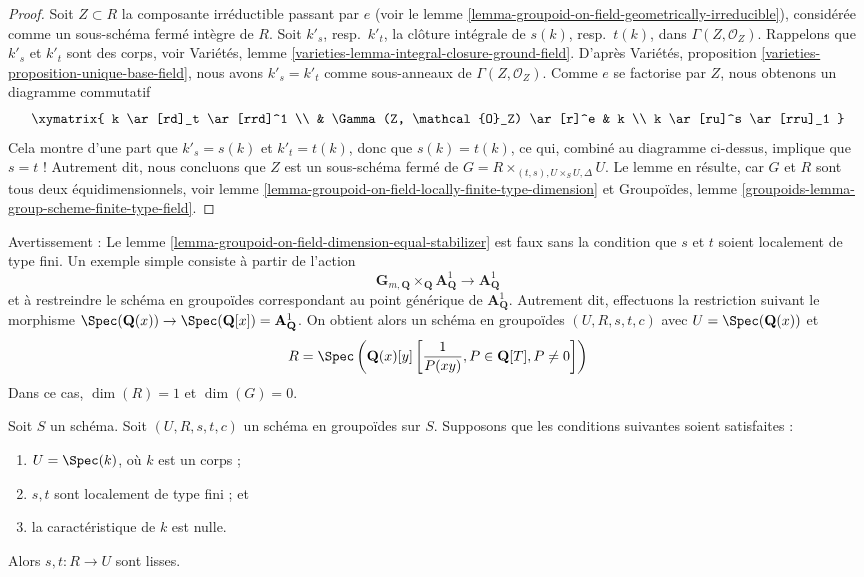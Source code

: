 \begin{proof}
Soit $Z \subset R$ la composante irréductible passant par $e$ (voir le
lemme \ref{lemma-groupoid-on-field-geometrically-irreducible}),
considérée comme un sous-schéma fermé intègre de $R$.
Soit $k'_s$, resp.\ $k'_t$, la clôture intégrale de
$s(k)$, resp.\ $t(k)$, dans $\Gamma(Z, \mathcal{O}_Z)$.
Rappelons que $k'_s$ et $k'_t$ sont des corps, voir
Variétés, lemme \ref{varieties-lemma-integral-closure-ground-field}.
D'après
Variétés, proposition \ref{varieties-proposition-unique-base-field},
nous avons $k'_s = k'_t$ comme sous-anneaux de $\Gamma(Z, \mathcal{O}_Z)$.
Comme $e$ se factorise par $Z$, nous obtenons un diagramme commutatif
$$
\xymatrix{
k \ar[rd]_t \ar[rrd]^1 \\
& \Gamma(Z, \mathcal{O}_Z) \ar[r]^e & k \\
k \ar[ru]^s \ar[rru]_1
}
$$
Cela montre d'une part que $k'_s = s(k)$ et $k'_t = t(k)$, donc que
$s(k) = t(k)$, ce qui, combiné au diagramme ci-dessus, implique
que $s = t$ ! Autrement dit, nous concluons que $Z$ est un sous-schéma fermé
de $G = R \times_{(t, s), U \times_S U, \Delta} U$.
Le lemme en résulte, car $G$ et $R$ sont tous deux équidimensionnels, voir
lemme \ref{lemma-groupoid-on-field-locally-finite-type-dimension} et
Groupoïdes, lemme \ref{groupoids-lemma-group-scheme-finite-type-field}.
\end{proof}

\begin{remark}
\label{remark-warn-dimension-groupoid-on-field}
Avertissement :
Le lemme \ref{lemma-groupoid-on-field-dimension-equal-stabilizer}
est faux sans la condition que $s$ et $t$ soient localement de
type fini.
Un exemple simple consiste à partir de l'action
$$
\mathbf{G}_{m, \mathbf{Q}} \times_{\mathbf{Q}} \mathbf{A}^1_{\mathbf{Q}}
\to \mathbf{A}^1_{\mathbf{Q}}
$$
et à restreindre le schéma en groupoïdes correspondant au point générique de
$\mathbf{A}^1_{\mathbf{Q}}$. Autrement dit, effectuons la restriction suivant le morphisme
$\Spec(\mathbf{Q}(x)) \to
\Spec(\mathbf{Q}[x]) = \mathbf{A}^1_{\mathbf{Q}}$.
On obtient alors un schéma en groupoïdes
$(U, R, s, t, c)$ avec
$U = \Spec(\mathbf{Q}(x))$
et
$$
R = \Spec\left(
\mathbf{Q}(x)[y]\left[
\frac{1}{P(xy)}, P \in \mathbf{Q}[T], P \not = 0
\right]
\right)
$$
Dans ce cas, $\dim(R) = 1$ et $\dim(G) = 0$.
\end{remark}

\begin{lemma}
\label{lemma-groupoid-characteristic-zero-smooth}
Soit $S$ un schéma. Soit $(U, R, s, t, c)$ un schéma en groupoïdes
sur $S$. Supposons que les conditions suivantes soient satisfaites :
\begin{enumerate}
\item $U = \Spec(k)$, où $k$ est un corps ;
\item $s, t$ sont localement de type fini ; et
\item la caractéristique de $k$ est nulle.
\end{enumerate}
Alors $s, t : R \to U$ sont lisses.
\end{lemma}

